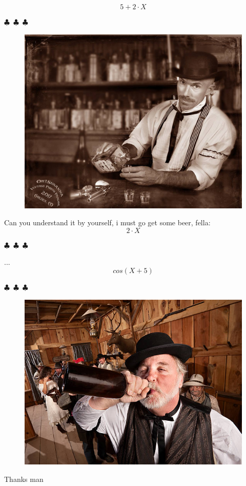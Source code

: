 \documentclass{article}
\begin{document}
\begin{equation}
{{5}+{{2}\cdot{X}}}
\end{equation}
\begin{center} $\clubsuit$~$\clubsuit$~$\clubsuit$ \end{center}\begin{figure}[H] \includegraphics[scale=0.3]{funny_pics/bartender.jpg} \end{figure}Can you understand it by yourself, i must go get some beer, fella:
\begin{equation}
{{2}\cdot{X}}
\end{equation}
\begin{center} $\clubsuit$~$\clubsuit$~$\clubsuit$ \end{center}...
\begin{equation}
{cos({{X}+{5}})}
\end{equation}
\begin{center} $\clubsuit$~$\clubsuit$~$\clubsuit$ \end{center}\begin{figure}[H] \includegraphics[scale=1.4]{funny_pics/drunk_cowboy.jpg} \end{figure}Thanks man
\end{document}
